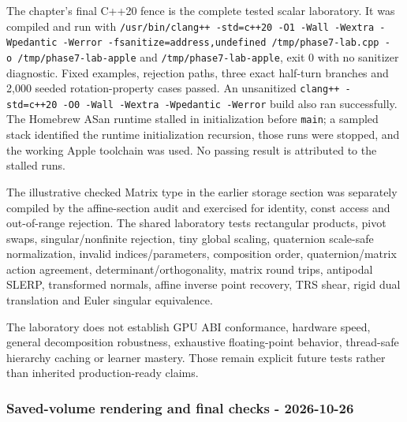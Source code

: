 The chapter's final C++20 fence is the complete tested scalar laboratory. It was compiled and run with \texttt{/usr/bin/clang++\ -std=c++20\ -O1\ -Wall\ -Wextra\ -Wpedantic\ -Werror\ -fsanitize=address,undefined\ /tmp/phase7-lab.cpp\ -o\ /tmp/phase7-lab-apple} and \texttt{/tmp/phase7-lab-apple}, exit 0 with no sanitizer diagnostic. Fixed examples, rejection paths, three exact half-turn branches and 2,000 seeded rotation-property cases passed. An unsanitized \texttt{clang++\ -std=c++20\ -O0\ -Wall\ -Wextra\ -Wpedantic\ -Werror} build also ran successfully. The Homebrew ASan runtime stalled in initialization before \texttt{main}; a sampled stack identified the runtime initialization recursion, those runs were stopped, and the working Apple toolchain was used. No passing result is attributed to the stalled runs.

The illustrative checked Matrix type in the earlier storage section was separately compiled by the affine-section audit and exercised for identity, const access and out-of-range rejection. The shared laboratory tests rectangular products, pivot swaps, singular/nonfinite rejection, tiny global scaling, quaternion scale-safe normalization, invalid indices/parameters, composition order, quaternion/matrix action agreement, determinant/orthogonality, matrix round trips, antipodal SLERP, transformed normals, affine inverse point recovery, TRS shear, rigid dual translation and Euler singular equivalence.

The laboratory does not establish GPU ABI conformance, hardware speed, general decomposition robustness, exhaustive floating-point behavior, thread-safe hierarchy caching or learner mastery. Those remain explicit future tests rather than inherited production-ready claims.

\subsubsection{Saved-volume rendering and final checks - 2026-10-26}\label{appendix-a103e7846d21-saved-volume-rendering-and-final-checks---2026-10-26}

